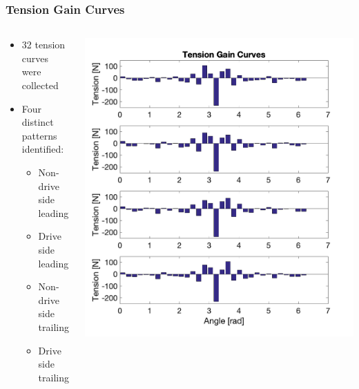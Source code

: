 \documentclass[mathserif]{beamer}
\begin{document}
\begin{frame}
\frametitle{Tension Gain Curves}
\begin{columns}[T] 
    \begin{column}[T]{5.25cm} 
        \begin{itemize}
        \item 32 tension curves were collected
        \item Four distinct patterns identified:
        	\begin{itemize}
            \item Non-drive side leading
            \item Drive side leading
            \item Non-drive side trailing
            \item Drive side trailing
	\end{itemize}
        \end{itemize}
     \end{column}
     \begin{column}[T]{5cm} %
          \includegraphics[totalheight=6cm]{TensionGC}
     \end{column}
 \end{columns}
\end{frame}
\end{document}
